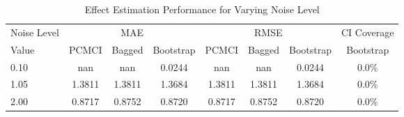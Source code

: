 \begin{table}[htbp]
\centering
\caption{Effect Estimation Performance for Varying Noise Level}
\label{tab:noise_performance}
\begin{tabular}{l|ccc|ccc|c}
\hline
Noise Level & \multicolumn{3}{c|}{MAE} & \multicolumn{3}{c|}{RMSE} & CI Coverage \\
 Value & PCMCI & Bagged & Bootstrap & PCMCI & Bagged & Bootstrap & Bootstrap \\
\hline
0.10 & nan & nan & 0.0244 & nan & nan & 0.0244 & 0.0\% \\
1.05 & 1.3811 & 1.3811 & 1.3684 & 1.3811 & 1.3811 & 1.3684 & 0.0\% \\
2.00 & 0.8717 & 0.8752 & 0.8720 & 0.8717 & 0.8752 & 0.8720 & 0.0\% \\
\hline
\end{tabular}
\end{table}
